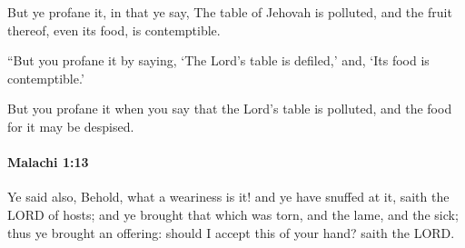 			\begin{versebox}
					\item[BHS] 
					\item[LXX] 
					\item[ASV] But ye profane it, in that ye say, The table of Jehovah is polluted, and the fruit thereof, even its food, is contemptible.
					\item[NIV] “But you profane it by saying, ‘The Lord’s table is defiled,’ and, ‘Its food is contemptible.’
					\item[NRSV] But you profane it when you say that the Lord’s table is polluted, and the food for it may be despised.
			\end{versebox}

		\paragraph{Malachi 1:13} %
			\label{MALACHI-1-13}

			Ye said also, Behold, what a weariness is it! and ye have snuffed at it, saith the LORD of hosts; and ye brought that which was torn, and the lame, and the sick; thus ye brought an offering: should I accept this of your hand? saith the LORD.

